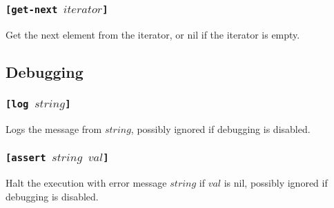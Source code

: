 \subsubsection{\tt{[get-next }$iterator$\tt{]}}
Get the next element from the iterator, or nil if the iterator is empty.

\subsection{Debugging}
\subsubsection{\tt{[log }$string$\tt{]}}
Logs the message from $string$, possibly ignored if debugging is disabled.
\subsubsection{\tt{[assert }$string$ $val$\tt{]}}
Halt the execution with error message $string$ if $val$ is nil, possibly ignored if debugging is disabled.

